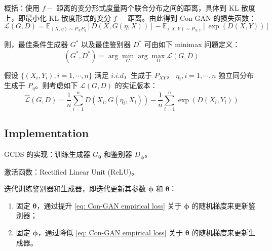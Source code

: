 \documentclass{myarticle}
\begin{document}
    概括：使用 $f-$ 距离的变分形式度量两个联合分布之间的距离，具体到 KL 散度上，即最小化 KL 散度形式的变分 $f-$ 距离。由此得到 Con-GAN 的损失函数：
    \begin{equation}
        \mathcal{L}(G,D)=\mathbb{E}_{(X,\eta)\sim P_XP_\eta}[D(X,G(\eta,X))]-\mathbb{E}_{(X,Y)\sim P_{X,Y}}[\exp(D(X,Y))]
        \label{eq: Con-GAN loss}
    \end{equation}

    则，最佳条件生成器 $G^{*}$ 以及最佳鉴别器 $D^{*}$ 可由如下 minimax 问题定义：
    \begin{equation}
        (G^{*},D^{*})=\arg\min_{G}\arg\max_{D}\mathcal{L}(G,D)
        \label{eq: Con-GAN minmax}
    \end{equation}

    假设 $\{(X_{i},Y_{i}),i=1,\cdots,n\}$ 满足 $i.i.d$，生成于 $P_{XY}$， $\eta_{i},i=1,\cdots,n$ 独立同分布生成于 $P_{\eta}$。则考虑如下 $\mathcal{L}(G,D)$ 的实证版本：
    \begin{equation}
        \hat{\mathcal{L}}(G,D)=\frac{1}{n}\sum_{i=1}^{n}D(X_{i},G(\eta_{i},X_{i})) - \frac{1}{n}\sum_{i=1}^{n}\exp(D(X_{i},Y_{i}))
        \label{eq: Con-GAN empirical loss}
    \end{equation}

    \subsection{Implementation}

    GCDS 的实现：训练生成器 $G_{\boldsymbol{\theta}}$ 和鉴别器 $D_{\boldsymbol{\phi}}$。
    
    激活函数：Rectified Linear Unit (ReLU)。

    迭代训练鉴别器和生成器，即迭代更新其参数 $\boldsymbol{\phi}$ 和 $\boldsymbol{\theta}$：
    \begin{enumerate}[label=(\arabic*)]
        \item 固定 $\boldsymbol{\theta}$，通过提升 \eqref{eq: Con-GAN empirical loss} 关于 $\boldsymbol{\phi}$ 的随机梯度来更新鉴别器；
        \item 固定 $\boldsymbol{\phi}$，通过降低 \eqref{eq: Con-GAN empirical loss} 关于 $\boldsymbol{\theta}$ 的随机梯度来更新生成器。
    \end{enumerate}
\end{document}
